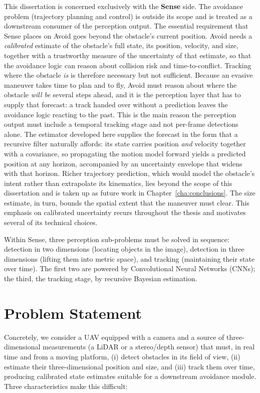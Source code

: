This dissertation is concerned exclusively with the \textbf{Sense} side. The
avoidance problem (trajectory planning and control) is outside its scope and
is treated as a downstream consumer of the perception output. The essential
requirement that Sense places on Avoid goes beyond the obstacle's current
position. Avoid needs a \emph{calibrated} estimate of the obstacle's full state,
its position, velocity, and size, together with a trustworthy measure of the
uncertainty of that estimate, so that the avoidance logic can reason about
collision risk and time-to-conflict. Tracking where the obstacle \emph{is} is
therefore necessary but not sufficient. Because an evasive maneuver takes time to
plan and to fly, Avoid must reason about where the obstacle \emph{will be} several
steps ahead, and it is the perception layer that has to supply that forecast: a
track handed over without a prediction leaves the avoidance logic reacting to the
past. This is the main reason the perception output must include a temporal
tracking stage and not per-frame detections alone. The estimator developed here
supplies the forecast in the form that a recursive filter naturally affords:
its state carries position \emph{and} velocity together with a covariance, so
propagating the motion model forward yields a predicted position at any horizon,
accompanied by an uncertainty envelope that widens with that horizon. Richer
trajectory prediction, which would model the obstacle's intent rather than
extrapolate its kinematics, lies beyond the scope of this dissertation and is
taken up as future work in Chapter~\ref{cha:conclusions}. The size estimate, in
turn, bounds the spatial extent that the maneuver must clear. This emphasis on
calibrated uncertainty recurs throughout the thesis and motivates several of its
technical choices.

Within Sense, three perception sub-problems must be solved in sequence:
detection in two dimensions (locating objects in the image), detection in three
dimensions (lifting them into metric space), and tracking (maintaining their
state over time). The first two are powered by Convolutional Neural
Networks (CNNs); the third, the tracking stage, by recursive
Bayesian estimation.

\section{Problem Statement}

Concretely, we consider a UAV equipped with a camera and a source of
three-dimensional measurements (a LiDAR or a stereo/depth sensor) that must,
in real time and from a moving platform, (i) detect obstacles in its field of
view, (ii) estimate their three-dimensional position and size, and (iii) track
them over time, producing calibrated state estimates suitable for a downstream
avoidance module. Three characteristics make this difficult:

